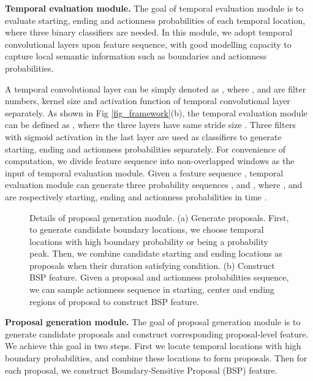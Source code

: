 \documentclass[runningheads]{llncs}
\begin{document}
\noindent
{\bf Temporal evaluation module.}
The goal of temporal evaluation module is to evaluate starting, ending and actionness probabilities of each temporal location, where three binary classifiers are needed. In this module, we adopt temporal convolutional layers upon feature sequence, with good modelling capacity to capture local semantic information such as boundaries and actionness probabilities.

A temporal convolutional layer can be simply  denoted as , where ,  and  are filter numbers, kernel size and activation function of temporal convolutional layer separately. As shown in Fig \ref{fig_framework}(b), the temporal evaluation module can be defined as , where the three layers have same stride size . 
Three filters with sigmoid activation in the last layer are used as classifiers to generate starting, ending and actionness probabilities separately.
For convenience of computation, we divide feature sequence  into non-overlapped windows as the input of temporal evaluation module. 
Given a feature sequence , temporal evaluation module can  generate three probability sequences ,  and , where ,  and  are respectively starting, ending and actionness probabilities in time .


\begin{figure}[t] 
\setlength{\abovecaptionskip}{-0.0cm} \setlength{\belowcaptionskip}{-0.5cm} \centering  
\makeatletter\def\@captype{figure}\makeatother 
{} 
\hspace{-0.2 in}  
\caption{Details of proposal generation module. (a) Generate proposals. First, to generate candidate boundary locations, we choose temporal locations with high boundary probability or being a probability peak. Then, we combine candidate starting and ending locations as proposals when their duration satisfying  condition. 
(b) Construct BSP feature. Given a proposal and actionness probabilities sequence, we can sample actionness sequence in starting, center and ending regions of proposal to construct BSP feature.} 
\label{fig_pgm} 
\end{figure} 



\noindent
{\bf Proposal generation module.}
The goal of proposal generation module is to generate candidate proposals and construct corresponding proposal-level feature.
We achieve this goal in two steps. First we locate temporal locations with high boundary probabilities, and combine these locations to form proposals. Then for each proposal, we construct Boundary-Sensitive Proposal (BSP) feature.
\end{document}
